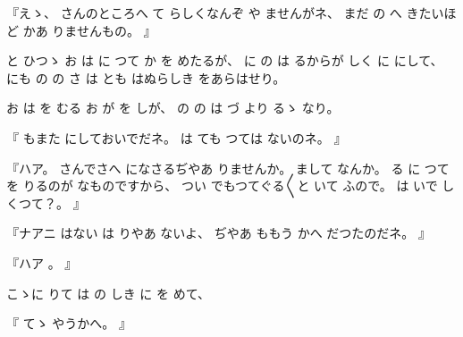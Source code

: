 %
『えゝ、
%
さんのところへ
て
らしくなんぞ
や
ませんがネ、
%
まだ
の
へ
きたいほど
かあ
りませんもの。
』

%
と
ひつゝ
お
は
に
つて
か
を
めたるが、
%
に
の
は
るからが
しく
に
にして、%
%
にも
の
の
さ
は
とも
はぬらしき
をあらはせり。

%
お
は
を
むる
お
が
を
しが、
%
の
の
は
づ
より
るゝ
なり。

%
『
もまた
にしておいでだネ。
%
は
ても
つては
ないのネ。
』

%
『ハア。
%
さんでさへ
になさるぢやあ
りませんか。
%
まして
なんか。
%
る
に
つて
を
りるのが
なものですから、
%
つい
でもつてぐる〳〵と
いて
ふので。
%
は
いで
しくつて？。
』

%
『ナアニ
はない
は
りやあ
ないよ、
%
ぢやあ
ももう
かへ
だつたのだネ。
』

%
『ハア
。
』

%
こゝに
りて
は
の
しき
に
を
めて、

%
『
てゝ
やうかへ。
』

